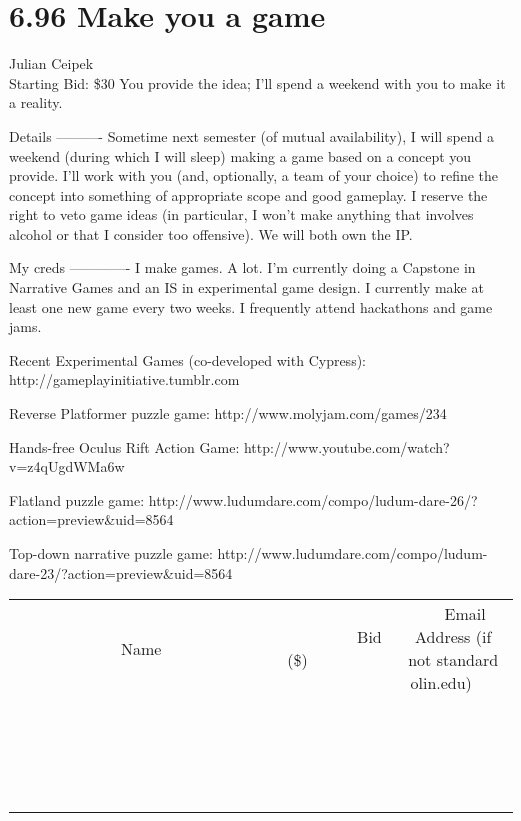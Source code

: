 \documentclass[11pt]{article}
\begin{document}
\section*{6.96 Make you a game}
Julian Ceipek
\\
Starting Bid: \$30
\newline
You provide the idea; I'll spend a weekend with you to make it a reality.

Details
----------
Sometime next semester (of mutual availability), I will spend a weekend (during which I will sleep) making a game based on a concept you provide. I'll work with you (and, optionally, a team of your choice) to refine the concept into something of appropriate scope and good gameplay. I reserve the right to veto game ideas (in particular, I won't make anything that involves alcohol or that I consider too offensive). We will both own the IP.

My creds
-------------
I make games. A lot. I'm currently doing a Capstone in Narrative Games and an IS in experimental game design. I currently make at least one new game every two weeks. I frequently attend hackathons and game jams.

Recent Experimental Games (co-developed with Cypress):
http://gameplayinitiative.tumblr.com

Reverse Platformer puzzle game:
http://www.molyjam.com/games/234

Hands-free Oculus Rift Action Game:
http://www.youtube.com/watch?v=z4qUgdWMa6w

Flatland puzzle game:
http://www.ludumdare.com/compo/ludum-dare-26/?action=preview\&uid=8564

Top-down narrative puzzle game:
http://www.ludumdare.com/compo/ludum-dare-23/?action=preview\&uid=8564
\\[3ex]
\begin{tabular}{c c c}
~~~~~~~~~~~~~Name~~~~~~~~~~~~~ & ~~~~~~~~~Bid (\$)~~~~~~~~~  & ~~~Email Address (if not standard olin.edu)~~~\\
 & & \\
\hline
 & & \\
\hline
 & & \\
\hline
 & & \\
\hline
 & & \\
\hline
 & & \\
\hline
 & & \\
\hline
 & & \\
\hline
 & & \\
\hline
 & & \\
\hline
 & & \\
\hline
 & & \\
\hline
 & & \\
\hline
 & & \\
\hline
 & & \\
\hline
 & & \\
\hline
 & & \\
\hline
 & & \\
\hline
 & & \\
\hline
\end{tabular}
\newpage
\end{document}
